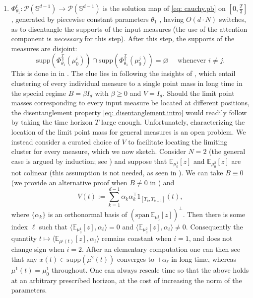 \documentclass[a4paper,11pt]{article}
\theoremstyle{plain}
\newcommand{\supp}{\mathrm{supp}}
\renewcommand{\S}{\mathbb{S}^{d-1}}
\newcommand{\bW}{\bm{\mathit{W}}}
\newcommand{\bV}{\bm{\mathit{V}}}
\newcommand{\bB}{\bm{\mathit{B}}}
\renewcommand{\geq}{\geqslant}
\numberwithin{equation}{section}
\newcommand{\nbbg}[1]{ {\text{\bf bg:} \color{mygrey}{#1}} }
\newcommand{\ndpr}[1]{ {\colorbox{MIT}{\color{white} \textsf{PR}} \color{MIT}{#1}} }
\begin{document}
\begin{enumerate}
\item $\Phi_{\theta_1}^t:\mathscr{P}(\S)\to\mathscr{P}(\S)$ is the solution map of \eqref{eq: cauchy.pb} on $[0,\frac{T}{3}]$, generated by piecewise constant parameters $\theta_1$ %
, having $O(d\cdot N)$ switches, as to disentangle the supports of the input measures (the use of the attention component is \emph{necessary} for this step). After this step, the supports of the measures are disjoint:
\begin{equation} \label{eq: disentanglement.intro}
\supp\left(\Phi_{\theta_1}^{\frac{T}{3}}(\mu_0^i)\right)\cap\supp\left(\Phi_{\theta_1}^{\frac{T}{3}}(\mu_0^j)\right)=\varnothing\quad\text{ whenever }i\neq j.
\end{equation}
This is done in  in {\bf {}}.
The clue lies in following the insights of \cite{geshkovski2023mathematical}, which entail clustering of every individual measure to a single point mass in long time in the special regime $\bB=\beta I_d$ with $\beta\geq 0$ and $\bV=I_d$. Should the limit point masses corresponding to every input measure be located at different positions, the disentanglement property \eqref{eq: disentanglement.intro} would readily follow by taking the time horizon $T$ large enough. Unfortunately, characterizing the location of the limit point mass for general measures is an open problem. 
We instead consider a curated choice of $\bV$ to facilitate locating the limiting cluster for every measure, which we now sketch. Consider $N=2$ (the general case is argued by induction; see ) and suppose that $\mathbb{E}_{\mu_0^1}[z]$ and $\mathbb{E}_{\mu_0^2}[z]$ are not colinear (this assumption is not needed, as seen in ). 
We can take $\bB\equiv0$ (we provide an alternative proof when $\bB\not\equiv0$ in {\bf {}}) and 
\begin{equation*}
    \bV(t) := \sum_{k=1}^{d-1} \alpha_k\alpha_k^\top 1_{[T_k,T_{k+1}]}(t),
\end{equation*}
where $\{\alpha_k\}$ is an orthonormal basis of $(\text{span}\,\mathbb{E}_{\mu_0^1}[z])^\perp$. Then there is some index $\ell$ such that $\langle \mathbb{E}_{\mu_0^1}[z], \alpha_\ell\rangle=0$ and $\langle \mathbb{E}_{\mu_0^2}[z], \alpha_\ell\rangle\neq 0$. Consequently the quantity $t\mapsto\langle \mathbb{E}_{\mu^i(t)}[z], \alpha_\ell\rangle$ remains constant when $i=1$, and does not change sign when $i=2$. After an elementary computation one can then see that any $x(t)\in\supp(\mu^2(t))$ converges to $\pm\alpha_\ell$ in long time, whereas $\mu^1(t)=\mu_0^1$ throughout. One can always rescale time so that the above holds at an arbitrary prescribed horizon, at the cost of increasing the norm of the parameters.


\end{enumerate}
\end{document}
